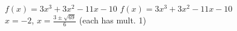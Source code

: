 {$f(x) = 3x^{3} + 3x^{2} - 11x - 10$}
{$f(x) = 3x^{3} + 3x^{2} - 11x - 10$ \\ $x = -2$, $x = \frac{3 \pm \sqrt{69}}{6}$ (each has mult. 1)}